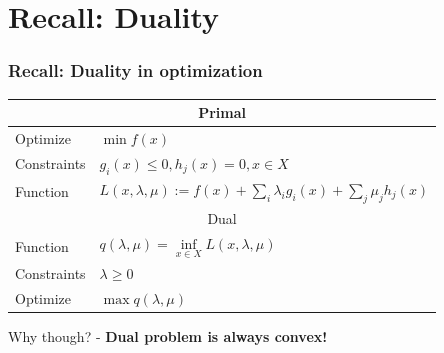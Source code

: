 \documentclass{beamer}
\begin{document}
\section{Recall: Duality}

\begin{frame}
\frametitle{Recall: Duality in optimization}





\end{frame}

\begin{frame}
\begin{tabular}{ll}
\toprule[1.5pt]
\multicolumn{2}{c}{Primal}\\\midrule
Optimize&$\min f(x)$\\\midrule
Constraints&$g_i(x)\le0, h_j(x)=0, x\in X$\\\midrule
Function&$L(x,\lambda,\mu):=f(x)+\sum_i\lambda_i g_i(x)+\sum_j\mu_j h_j(x)$\\\midrule
\multicolumn{2}{c}{Dual}\\\midrule
Function&$q(\lambda,\mu)=\inf\limits_{x\in X} L(x,\lambda,\mu)$\\\midrule
Constraints&$\lambda\ge0$\\\midrule
Optimize&$\max q(\lambda,\mu)$\\\midrule
\end{tabular}
\vspace{15pt}

Why though? - \textbf{Dual problem is always convex!}

\end{frame}
\end{document}
